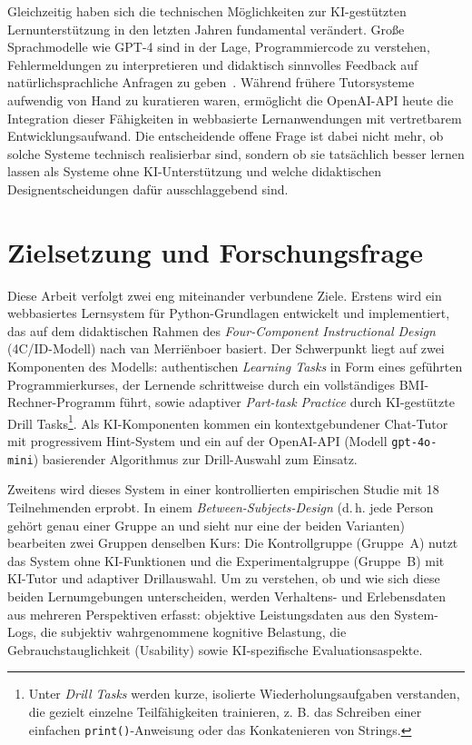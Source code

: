Gleichzeitig haben sich die technischen Möglichkeiten zur KI-gestützten Lernunterstützung in den letzten Jahren fundamental verändert. Große Sprachmodelle wie GPT-4 sind in der Lage, Programmiercode zu verstehen, Fehlermeldungen zu interpretieren und didaktisch sinnvolles Feedback auf natürlichsprachliche Anfragen zu geben~\cite{kasneci2023}. Während frühere Tutorsysteme aufwendig von Hand zu kuratieren waren, ermöglicht die OpenAI-API heute die Integration dieser Fähigkeiten in webbasierte Lernanwendungen mit vertretbarem Entwicklungsaufwand. Die entscheidende offene Frage ist dabei nicht mehr, ob solche Systeme technisch realisierbar sind, sondern ob sie tatsächlich besser lernen lassen als Systeme ohne KI-Unterstützung und welche didaktischen Designentscheidungen dafür ausschlaggebend sind.


\section{Zielsetzung und Forschungsfrage}\label{sec:zielsetzung}

Diese Arbeit verfolgt zwei eng miteinander verbundene Ziele. Erstens wird ein webbasiertes Lernsystem für Python-Grundlagen entwickelt und implementiert, das auf dem didaktischen Rahmen des \textit{Four-Component Instructional Design} (4C/ID-Modell) nach van Merriënboer basiert. Der Schwerpunkt liegt auf zwei Komponenten des Modells: authentischen \textit{Learning Tasks} in Form eines geführten Programmierkurses, der Lernende schrittweise durch ein vollständiges BMI-Rechner-Programm führt, sowie adaptiver \textit{Part-task Practice} durch KI-gestützte Drill Tasks\footnote{Unter \textit{Drill Tasks} werden kurze, isolierte Wiederholungsaufgaben verstanden, die gezielt einzelne Teilfähigkeiten trainieren, z. B. das Schreiben einer einfachen \texttt{print()}-Anweisung oder das Konkatenieren von Strings.}. Als KI-Komponenten kommen ein kontextgebundener Chat-Tutor mit progressivem Hint-System und ein auf der OpenAI-API (Modell \texttt{gpt-4o-mini}) basierender Algorithmus zur Drill-Auswahl zum Einsatz.

Zweitens wird dieses System in einer kontrollierten empirischen Studie mit 18 Teilnehmenden erprobt. In einem \textit{Between-Subjects-Design} (d.\,h. jede Person gehört genau einer Gruppe an und sieht nur eine der beiden Varianten) bearbeiten zwei Gruppen denselben Kurs: Die Kontrollgruppe (Gruppe~A) nutzt das System ohne KI-Funktionen und die Experimentalgruppe (Gruppe~B) mit KI-Tutor und adaptiver Drillauswahl.
Um zu verstehen, ob und wie sich diese beiden Lernumgebungen unterscheiden, werden Verhaltens- und Erlebensdaten aus mehreren Perspektiven erfasst: objektive Leistungsdaten aus den System-Logs, die subjektiv wahrgenommene kog\-nitive Belastung, die Gebrauchstauglichkeit (Usability) sowie KI-spezifische Evaluationsaspekte.

